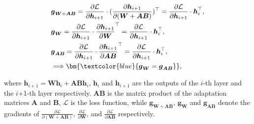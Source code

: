 {\begin{equation}
\begin{split}
    & \boldsymbol{g}_{\boldsymbol{W}+\boldsymbol{A}\boldsymbol{B}} = \frac{\partial {\mathcal{L}}}{\partial \boldsymbol{h}_{i+1}} \cdot (\frac{\partial \boldsymbol{h}_{i+1}}{\partial (\boldsymbol{W} + \boldsymbol{A}\boldsymbol{B})}) ^ {\top} = \frac{\partial {\mathcal{L}}}{\partial \boldsymbol{h}_{i+1}} \cdot \boldsymbol{h}_i ^ {\top}, \\
    & \boldsymbol{g}_{\boldsymbol{W}} = \frac{\partial {\mathcal{L}}}{\partial \boldsymbol{h}_{i+1}} \cdot \frac{\partial \boldsymbol{h}_{i+1}}{\partial \boldsymbol{W}} ^ {\top} = \frac{\partial {\mathcal{L}}}{\partial \boldsymbol{h}_{i+1}} \cdot \boldsymbol{h}_i ^ {\top}, \\
    & \boldsymbol{g}_{\boldsymbol{A}\boldsymbol{B}} = \frac{\partial {\mathcal{L}}}{\partial \boldsymbol{h}_{i+1}} \cdot \frac{\partial \boldsymbol{h}_{i+1}}{\partial \boldsymbol{A}\boldsymbol{B}} ^ {\top} = \frac{\partial {\mathcal{L}}}{\partial \boldsymbol{h}_{i+1}} \cdot \boldsymbol{h}_i ^ {\top},\\
    & \Longrightarrow  \bm{\textcolor{blue}{ \boldsymbol{g}_{\boldsymbol{W}} = \boldsymbol{g}_{\boldsymbol{A}\boldsymbol{B}}}} ,
\end{split}
\label{graident}
\end{equation}

\label{eq:gW_gAB}
where $\boldsymbol{h}_{i+1} = \boldsymbol{W} \boldsymbol{h}_i + \boldsymbol{A}\boldsymbol{B} \boldsymbol{h}_i$, $\boldsymbol{h}_i$ and $\boldsymbol{h}_{i+1}$ are the outputs of the $i$-th layer and the $i$+1-th layer respectively. $\boldsymbol{A}\boldsymbol{B}$ is the matrix product of the adaptation matrices $\boldsymbol{A}$ and $\boldsymbol{B}$, $ {\mathcal{L}} $ is the loss function, while $\boldsymbol{g}_{\boldsymbol{W}+\boldsymbol{A}\boldsymbol{B}}$, $\boldsymbol{g}_{\boldsymbol{W}}$ and $\boldsymbol{g}_{\boldsymbol{A}\boldsymbol{B}}$ denote the gradients of $\frac{\partial {\mathcal{L}}}{\partial {(\boldsymbol{W}+\boldsymbol{A}\boldsymbol{B})} }$, $\frac{\partial {\mathcal{L}}}{\partial \boldsymbol{W}}$, and $\frac{\partial {\mathcal{L}}}{\partial \boldsymbol{A}\boldsymbol{B}}$ respectively. 
\large

}
